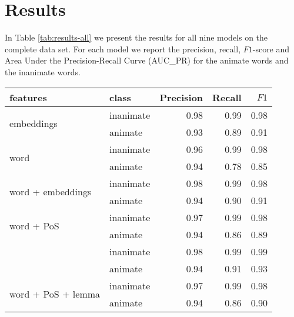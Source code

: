 \documentclass[a4paper,UKenglish]{oasics}
\begin{document}
\section{Results}\label{sec:results}

In Table \ref{tab:results-all} we present the results for all nine
models on the complete data set. For each model we report the
precision, recall, $F1$-score and Area Under the Precision-Recall
Curve (AUC_{PR}) for the animate words and the
inanimate words.
\begin{table}
\centering
\begin{tabular}{llrrr}
\toprule
features & class & Precision &  Recall & $F1$\\
\midrule
\multirow{2}{*}{embeddings}                            & inanimate     &       0.98 &    0.99 &    0.98 \\
                                                       & animate     &       0.93 &    0.89 &    0.91   \\
\multirow{2}{*}{word}                                  & inanimate     &       0.96 &    0.99 &    0.98 \\
                                                       & animate     &       0.94 &    0.78 &    0.85   \\
\multirow{2}{*}{word + embeddings}                     & inanimate     &       0.98 &    0.99 &    0.98 \\
                                                       & animate     &       0.94 &    0.90 &    0.91   \\
\multirow{2}{*}{word + PoS}                            & inanimate     &       0.97 &    0.99 &    0.98 \\
                                                       & animate     &       0.94 &    0.86 &    0.89   \\
\rowcolor{Gray}                                        & inanimate     &       0.98 &    0.99 &    0.99 \\
\rowcolor{Gray}\multirow{-2}{*}{word + PoS + embeddings}   & animate     &       0.94 &    0.91 &    0.93 \\
\multirow{2}{*}{word + PoS + lemma}                    & inanimate    &       0.97 &    0.99 &    0.98  \\
                                                       & animate     &       0.94 &    0.86 &    0.90   \\

\end{tabular}
\end{table}
\end{document}
